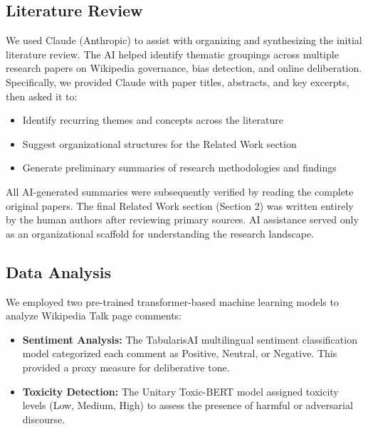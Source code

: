 
\subsection{Literature Review}

We used Claude (Anthropic) to assist with organizing and synthesizing the initial literature review. The AI helped identify thematic groupings across multiple research papers on Wikipedia governance, bias detection, and online deliberation. Specifically, we provided Claude with paper titles, abstracts, and key excerpts, then asked it to:

\begin{itemize}
    \item Identify recurring themes and concepts across the literature
    \item Suggest organizational structures for the Related Work section
    \item Generate preliminary summaries of research methodologies and findings
\end{itemize}

All AI-generated summaries were subsequently verified by reading the complete original papers. The final Related Work section (Section 2) was written entirely by the human authors after reviewing primary sources. AI assistance served only as an organizational scaffold for understanding the research landscape.

\subsection{Data Analysis}

We employed two pre-trained transformer-based machine learning models to analyze Wikipedia Talk page comments:

\begin{itemize}
    \item \textbf{Sentiment Analysis:} The TabularisAI multilingual sentiment classification model categorized each comment as Positive, Neutral, or Negative. This provided a proxy measure for deliberative tone.
    
    \item \textbf{Toxicity Detection:} The Unitary Toxic-BERT model assigned toxicity levels (Low, Medium, High) to assess the presence of harmful or adversarial discourse.
\end{itemize}


